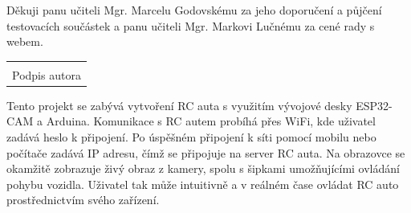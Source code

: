 \documentclass[12pt, a4paper,
oneside,      %
openany
]{report}
\newcommand\datumOdevzdani{1. 1. 2024} %
\begin{document}
	
	\noindent Děkuji panu učiteli Mgr. Marcelu 
Godovskému za jeho doporučení a půjčení testovacích součástek a panu učiteli Mgr. Markovi Lučnému za cené rady s webem.
	
	\vspace*{0.6\textheight} %

	\vfill
	\noindent{V Opavě \datumOdevzdani\\}
	\noindent
	\begin{minipage}{\linewidth}
		\hspace{7.5cm} 
		\begin{tabular}{@{}p{6cm}@{}}
			\dotfill \\
		Podpis autora
		\end{tabular}
	\end{minipage}
	
	\clearpage %

	\noindent Tento projekt se zabývá vytvoření RC auta s využitím vývojové desky ESP32-CAM a Arduina. Komunikace s RC autem probíhá přes WiFi, kde uživatel zadává heslo k připojení. Po úspěšném připojení k síti pomocí mobilu nebo počítače zadává IP adresu, čímž se připojuje na server RC auta. Na obrazovce se okamžitě zobrazuje živý obraz z kamery, spolu s šipkami umožňujícími ovládání pohybu vozidla. Uživatel tak může intuitivně a v reálném čase ovládat RC auto prostřednictvím svého zařízení.
	
	\vspace{18pt}
	
	
\end{document}
